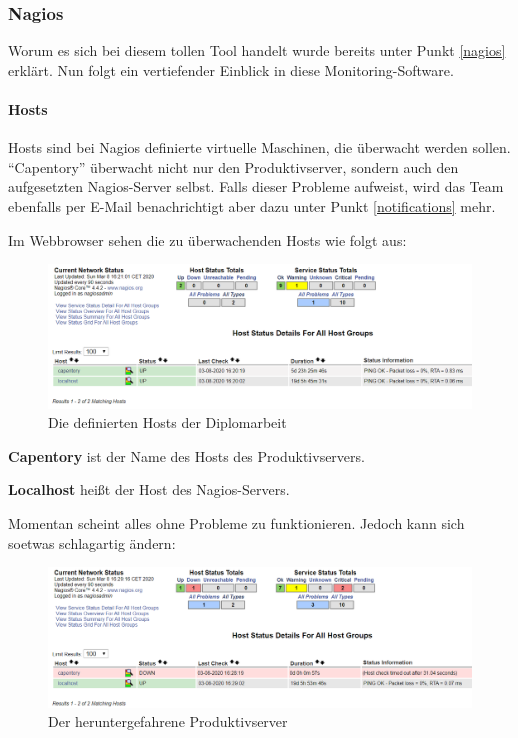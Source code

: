 \hypertarget{nagios-1}{%
\subsubsection{Nagios}\label{nagios-1}}

Worum es sich bei diesem tollen Tool handelt wurde bereits unter Punkt
\ref{nagios} erklärt. Nun folgt ein vertiefender Einblick in diese
Monitoring-Software.

\hypertarget{hosts}{%
\paragraph{Hosts}\label{hosts}}

Hosts sind bei Nagios definierte virtuelle Maschinen, die überwacht
werden sollen. ``Capentory'' überwacht nicht nur den Produktivserver,
sondern auch den aufgesetzten Nagios-Server selbst. Falls dieser
Probleme aufweist, wird das Team ebenfalls per E-Mail benachrichtigt
aber dazu unter Punkt \ref{notifications} mehr.

Im Webbrowser sehen die zu überwachenden Hosts wie folgt aus:

\begin{figure}[ht]
\centering
\includegraphics{hosts.png}
\caption{Die definierten Hosts der Diplomarbeit}
\end{figure}

\textbf{Capentory} ist der Name des Hosts des Produktivservers.

\textbf{Localhost} heißt der Host des Nagios-Servers.

Momentan scheint alles ohne Probleme zu funktionieren. Jedoch kann sich
soetwas schlagartig ändern:

\begin{figure}[ht]
\centering
\includegraphics{dedprod.png}
\caption{Der heruntergefahrene Produktivserver}
\end{figure}


